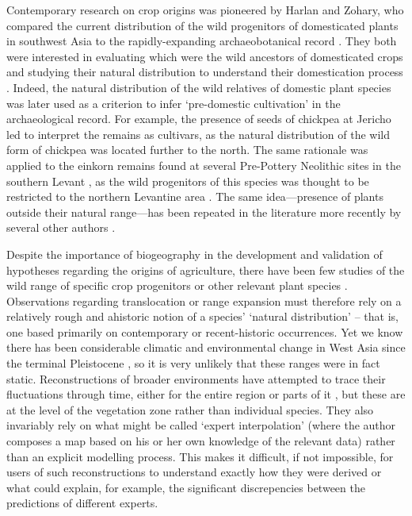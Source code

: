 \documentclass[
  authoryear,
  preprint]{elsarticle}
\begin{document}
Contemporary research on crop origins was pioneered by Harlan and
Zohary, who compared the current distribution of the wild progenitors of
domesticated plants in southwest Asia
\citep{HarlanZohary1966, Zohary1969, Zohary1973, ZoharyHopf1973} to the
rapidly-expanding archaeobotanical record
\citetext{\citealp{Harlan1971}; \citealp{Harlan1977}; \citealp[see
also][]{ZoharyHopf1988}; \citealp{HarlanZohary1966}}. They both were
interested in evaluating which were the wild ancestors of domesticated
crops and studying their natural distribution to understand their
domestication process
\citep{Zohary1969, Zohary1973, ZoharySpiegelRoy1975}. Indeed, the
natural distribution of the wild relatives of domestic plant species was
later used as a criterion to infer `pre-domestic cultivation' in the
archaeological record. For example, the presence of seeds of chickpea at
Jericho led \citet{Hopf1986} to interpret the remains as cultivars, as
the natural distribution of the wild form of chickpea was located
further to the north. The same rationale was applied to the einkorn
remains found at several Pre-Pottery Neolithic sites in the southern
Levant \citep{Hopf1969, Colledge2001}, as the wild progenitors of this
species was thought to be restricted to the northern Levantine area
\citep{HeunEtAl1997, ZoharyEtAl2012}. The same idea---presence of plants
outside their natural range---has been repeated in the literature more
recently by several other authors
\citep{TannoWillcox2006, WillcoxEtAl2008, HillmanEtAl2001}.

Despite the importance of biogeography in the development and validation
of hypotheses regarding the origins of agriculture, there have been few
studies of the wild range of specific crop progenitors or other relevant
plant species \citep[cf.~for domestic animals, e.g.][]{YeomansEtAl2017}.
Observations regarding translocation or range expansion must therefore
rely on a relatively rough and ahistoric notion of a species' `natural
distribution' -- that is, one based primarily on contemporary or
recent-historic occurrences. Yet we know there has been considerable
climatic and environmental change in West Asia since the terminal
Pleistocene \citep{JonesEtAl2019}, so it is very unlikely that these
ranges were in fact static. Reconstructions of broader environments have
attempted to trace their fluctuations through time, either for the
entire region
\citetext{\citealp[e.g.][]{VanZeistBottema1991}; \citealp[Hillman
in][]{MooreEtAl2000}} or parts of it \citep[e.g.][]{Cordova2007}, but
these are at the level of the vegetation zone rather than individual
species. They also invariably rely on what might be called `expert
interpolation' (where the author composes a map based on his or her own
knowledge of the relevant data) rather than an explicit modelling
process. This makes it difficult, if not impossible, for users of such
reconstructions to understand exactly how they were derived or what
could explain, for example, the significant discrepencies between the
predictions of different experts.
\end{document}
